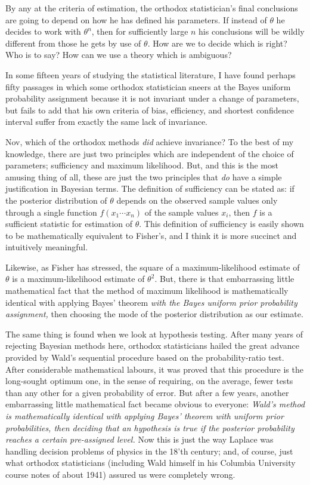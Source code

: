 \documentclass[12pt]{article}
\begin{document}
By any at the criteria of estimation, the orthodox statistician's final conclusions are going to depend on how he has defined his parameters. If instead of $\theta$ he decides to work with $\theta^n$, then for sufficiently large $n$ his conclusions will be wildly different from those he gets by use of $\theta$. How are we to decide which is right? Who is to say? How
can we use a theory which is ambiguous?

In some fifteen years of studying the statistical literature, I have found perhaps fifty passages in which some orthodox statistician sneers at the Bayes uniform probability assignment because it is not invariant under a change of parameters, but fails to add that his own criteria of bias, efficiency, and shortest confidence interval suffer from exactly the same lack of invariance.

Nov, which of the orthodox methods \emph{did} achieve invariance? To the best of my knowledge, there are just two principles which are independent of the choice of parameters; sufficiency and maximum likelihood. But, and this is the most amusing thing of all, these are just the two principles that \emph{do} have a simple justification in Bayesian terms. The definition of sufficiency can be stated as: if the posterior distribution of $\theta$ depends on the observed sample values only through a single function $f(x_1 \cdots x_n)$ of the sample values $x_i$, then $f$ is a sufficient statistic for estimation of $\theta$. This definition of
sufficiency is easily shown to be mathematically equivalent to Fisher's, and I think it is more succinct and intuitively meaningful.

Likewise, as Fisher has stressed, the square of a maximum-likelihood estimate of $\theta$ is a maximum-likelihood estimate of $\theta^2$. But, there is that embarrassing little mathematical fact that the method of maximum likelihood is mathematically identical with applying Bayes' theorem \emph{with the Bayes uniform prior probability assignment,} then choosing the mode of the posterior distribution as our estimate.

The same thing is found when we look at hypothesis testing. After many years of rejecting Bayesian methods here, orthodox statisticians hailed the great advance provided by Wald's sequential procedure based on the probability-ratio test. After considerable mathematical labours, it was proved that this procedure is the long-sought optimum one, in the sense of requiring, on the average, fewer tests than any other for a given probability of error. But after a few years, another embarrassing little mathematical fact became obvious to everyone: \emph{Wald's method is mathematically identical with applying Bayes' theorem with uniform prior probabilities, then deciding that an hypothesis is true if the posterior probability reaches a certain pre-assigned level.} Now this is just the way Laplace was handling decision problems of physics in the 18'th century; and, of course, just what orthodox statisticians (including Wald himself in his Columbia University course notes of about 1941) assured us were completely wrong.
\end{document}
